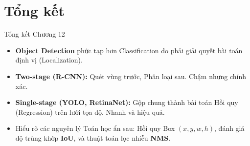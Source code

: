 \documentclass[aspectratio=169]{beamer}
\begin{document}
\section{Tổng kết}

\begin{frame}{Tổng kết Chương 12}
    \begin{itemize}
        \item \textbf{Object Detection} phức tạp hơn Classification do phải giải quyết bài toán định vị (Localization).
        \item \textbf{Two-stage (R-CNN):} Quét vùng trước, Phân loại sau. Chậm nhưng chính xác.
        \item \textbf{Single-stage (YOLO, RetinaNet):} Gộp chung thành bài toán Hồi quy (Regression) trên lưới tọa độ. Nhanh và hiệu quả.
        \item Hiểu rõ các nguyên lý Toán học ẩn sau: Hồi quy Box $(x,y,w,h)$, đánh giá độ trùng khớp \textbf{IoU}, và thuật toán lọc nhiễu \textbf{NMS}.
    \end{itemize}
\end{frame}
\end{document}
